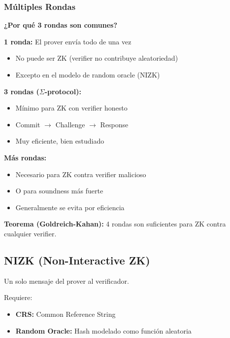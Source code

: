 \documentclass[11pt,a4paper,twoside,openright]{book}
\theoremstyle{definition}
\theoremstyle{plain}
\theoremstyle{remark}
\begin{document}
\subsubsection{Múltiples Rondas}

\begin{mathnote}
\textbf{¿Por qué 3 rondas son comunes?}

\textbf{1 ronda:} El prover envía todo de una vez
\begin{itemize}
    \item No puede ser ZK (verifier no contribuye aleatoriedad)
    \item Excepto en el modelo de random oracle (NIZK)
\end{itemize}

\textbf{3 rondas ($\Sigma$-protocol):}
\begin{itemize}
    \item Mínimo para ZK con verifier honesto
    \item Commit $\to$ Challenge $\to$ Response
    \item Muy eficiente, bien estudiado
\end{itemize}

\textbf{Más rondas:}
\begin{itemize}
    \item Necesario para ZK contra verifier malicioso
    \item O para soundness más fuerte
    \item Generalmente se evita por eficiencia
\end{itemize}

\textbf{Teorema (Goldreich-Kahan):} 4 rondas son suficientes para ZK contra cualquier verifier.
\end{mathnote}

\subsection{NIZK (Non-Interactive ZK)}

Un solo mensaje del prover al verificador.

Requiere:
\begin{itemize}
    \item \textbf{CRS:} Common Reference String
    \item \textbf{Random Oracle:} Hash modelado como función aleatoria
\end{itemize}
\end{document}

